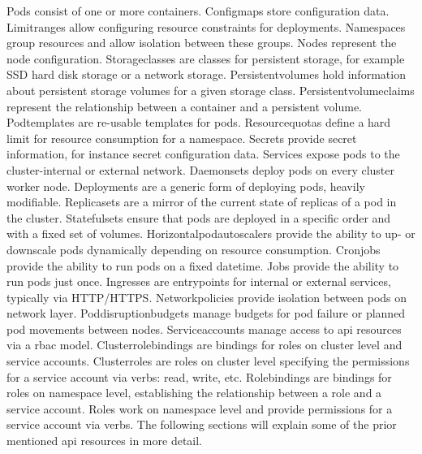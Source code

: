 \documentclass[titlepage]{report}
\begin{document}
Pods consist of one or more containers. Configmaps store configuration data. Limitranges allow configuring resource constraints for deployments. Namespaces group resources and allow isolation between these groups.
Nodes represent the node configuration. Storageclasses are classes for persistent storage, for example SSD hard disk storage or a network storage. Persistentvolumes hold information about persistent storage volumes for a given storage class.
Persistentvolumeclaims represent the relationship between a container and a persistent volume. Podtemplates are re-usable templates for pods. Resourcequotas define a hard limit for resource consumption for a namespace.
Secrets provide secret information, for instance secret configuration data. Services expose pods to the cluster-internal or external network. Daemonsets deploy pods on every cluster worker node. Deployments are a generic form of deploying pods, heavily modifiable.
Replicasets are a mirror of the current state of replicas of a pod in the cluster. Statefulsets ensure that pods are deployed in a specific order and with a fixed set of volumes. Horizontalpodautoscalers provide the ability to up- or downscale pods dynamically depending on resource consumption.
Cronjobs provide the ability to run pods on a fixed datetime. Jobs provide the ability to run pods just once. Ingresses are entrypoints for internal or external services, typically via HTTP/HTTPS. Networkpolicies provide isolation between pods on network layer.
Poddisruptionbudgets manage budgets for pod failure or planned pod movements between nodes. Serviceaccounts manage access to \gls{api} resources via a \gls{rbac} model. Clusterrolebindings are bindings for roles on cluster level and service accounts.
Clusterroles are roles on cluster level specifying the permissions for a service account via verbs: read, write, etc. Rolebindings are bindings for roles on namespace level, establishing the relationship between a role and a service account.
Roles work on namespace level and provide permissions for a service account via verbs. The following sections will explain some of the prior mentioned \gls{api} resources in more detail.
\end{document}
